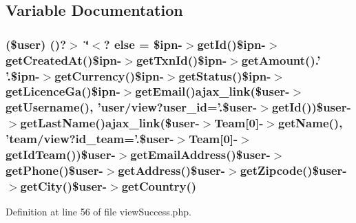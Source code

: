 \subsection{Variable Documentation}
\hypertarget{backend_2modules_2ipn_2templates_2view_success_8php_a922492e78a18c50308febb5901b37559}{
\subsubsection[{else}]{ (\$user) ()?$>$ \char`\"{}$<$? else = \$ipn-\/$>$get\-Id()\$ipn-\/$>${\bf get\-Created\-At}()\$ipn-\/$>$get\-Txn\-Id()\$ipn-\/$>$get\-Amount().' '.\$ipn-\/$>$get\-Currency()\$ipn-\/$>$get\-Status()\$ipn-\/$>$get\-Licence\-Ga()\$ipn-\/$>$get\-Email()ajax\-\_\-link(\$user-\/$>$get\-Username(), 'user/view?user\-\_\-id='.\$user-\/$>$get\-Id())\$user-\/$>$get\-Last\-Name()ajax\-\_\-link(\$user-\/$>$Team\mbox{[}0\mbox{]}-\/$>$get\-Name(), 'team/view?id\-\_\-team='.\$user-\/$>$Team\mbox{[}0\mbox{]}-\/$>$get\-Id\-Team())\$user-\/$>$get\-Email\-Address()\$user-\/$>$get\-Phone()\$user-\/$>$get\-Address()\$user-\/$>$get\-Zipcode()\$user-\/$>$get\-City()\$user-\/$>$get\-Country()}}\label{backend_2modules_2ipn_2templates_2view_success_8php_a922492e78a18c50308febb5901b37559}


Definition at line 56 of file view\-Success.\-php.

